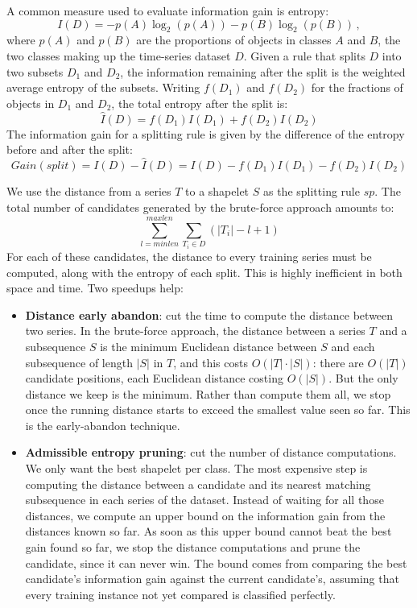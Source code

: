 A common measure used to evaluate information gain is entropy:
\begin{equation*}
    I(D) = -p(A) \log_2 (p(A)) -p(B) \log_2 (p(B)) \,,
\end{equation*}
where $p(A)$ and $p(B)$ are the proportions of objects in classes $A$ and $B$, the two classes making up the time-series dataset $D$. Given a rule that splits $D$ into two subsets $D_1$ and $D_2$, the information remaining after the split is the weighted average entropy of the subsets. Writing $f(D_1)$ and $f(D_2)$ for the fractions of objects in $D_1$ and $D_2$, the total entropy after the split is:
\begin{equation*}
    \hat{I}(D) = f(D_1)I(D_1) + f(D_2)I(D_2)
\end{equation*}
The information gain for a splitting rule is given by the difference of the entropy before and after the split:
\begin{equation*}
    \textit{Gain}(\textit{split}) = I(D) - \hat{I}(D) =  I(D) - f(D_1)I(D_1) - f(D_2)I(D_2)
\end{equation*}

We use the distance from a series $T$ to a shapelet $S$ as the splitting rule $sp$. The total number of candidates generated by the brute-force approach amounts to:
\begin{equation*}
    \sum_{l = \textit{minlen}}^{\textit{maxlen}} \sum_{T_i \in D}(|T_i| - l + 1)
\end{equation*}
For each of these candidates, the distance to every training series must be computed, along with the entropy of each split. This is highly inefficient in both space and time. Two speedups help:
\begin{itemize}
    \item \textbf{Distance early abandon}: cut the time to compute the distance between two series. In the brute-force approach, the distance between a series $T$ and a subsequence $S$ is the minimum Euclidean distance between $S$ and each subsequence of length $|S|$ in $T$, and this costs $O(|T| \cdot |S|)$: there are $O(|T|)$ candidate positions, each Euclidean distance costing $O(|S|)$. But the only distance we keep is the minimum. Rather than compute them all, we stop once the running distance starts to exceed the smallest value seen so far. This is the early-abandon technique.

    \item \textbf{Admissible entropy pruning}: cut the number of distance computations. We only want the best shapelet per class. The most expensive step is computing the distance between a candidate and its nearest matching subsequence in each series of the dataset. Instead of waiting for all those distances, we compute an upper bound on the information gain from the distances known so far. As soon as this upper bound cannot beat the best gain found so far, we stop the distance computations and prune the candidate, since it can never win. The bound comes from comparing the best candidate's information gain against the current candidate's, assuming that every training instance not yet compared is classified perfectly.
\end{itemize}

